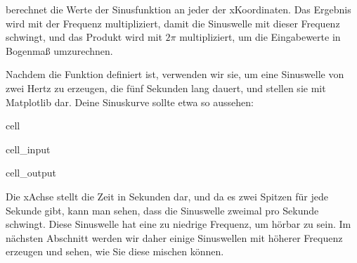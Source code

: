 \documentclass[letterpaper,10pt,english]{jupyterBook}
\begin{document}
\sphinxAtStartPar
{} berechnet die Werte der Sinusfunktion an jeder der x\sphinxhyphen{}Koordinaten. Das Ergebnis wird mit der Frequenz multipliziert, damit die Sinuswelle mit dieser Frequenz schwingt, und das Produkt wird mit \(2\pi\) multipliziert, um die Eingabewerte in Bogenmaß umzurechnen.

\sphinxAtStartPar
Nachdem die Funktion definiert ist, verwenden wir sie, um eine Sinuswelle von zwei Hertz zu erzeugen, die fünf Sekunden lang dauert, und stellen sie mit Matplotlib dar. Deine Sinuskurve sollte etwa so aussehen:

\begin{sphinxuseclass}{cell}\begin{sphinxVerbatimInput}

\begin{sphinxuseclass}{cell_input}
\begin{sphinxVerbatim}[commandchars=\\\{\}]
    
    

     

 
\end{sphinxVerbatim}

\end{sphinxuseclass}\end{sphinxVerbatimInput}
\begin{sphinxVerbatimOutput}

\begin{sphinxuseclass}{cell_output}
\noindent{}

\end{sphinxuseclass}\end{sphinxVerbatimOutput}

\end{sphinxuseclass}
\sphinxAtStartPar
Die x\sphinxhyphen{}Achse stellt die Zeit in Sekunden dar, und da es zwei Spitzen für jede Sekunde gibt, kann man sehen, dass die Sinuswelle zweimal pro Sekunde schwingt. Diese Sinuswelle hat eine zu niedrige Frequenz, um hörbar zu sein. Im nächsten Abschnitt werden wir daher einige Sinuswellen mit höherer Frequenz erzeugen und sehen, wie Sie diese mischen können.
\end{document}

